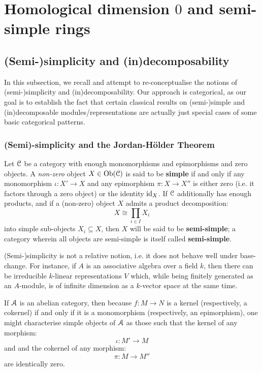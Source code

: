 \section{Homological dimension \texorpdfstring{$0$}{} and semi-simple rings}
    \subsection{(Semi-)simplicity and (in)decomposability}
        In this subsection, we recall and attempt to re-conceptualise the notions of (semi-)simplicity and (in)decomposability. Our approach is categorical, as our goal is to establish the fact that certain classical results on (semi-)simple and (in)decomposable modules/representations are actually just special cases of some basic categorical patterns. 
    
        \subsubsection{(Semi)-simplicity and the Jordan-H\"older Theorem}
            \begin{definition} \label{def: (semi)_simple_objects}
                Let $\mathcal{C}$ be a category with enough monomorphisms and epimorphisms and zero objects. A \textit{non-zero} object $X \in \mathrm{Ob}(\mathcal{C})$ is said to be \textbf{simple} if and only if any monomorphism $\iota: X' \to X$ and any epimorphism $\pi: X \to X''$ is either zero (i.e. it factors through a zero object) or the identity $\mathrm{id}_X$. If $\mathcal{C}$ additionally has enough products, and if a (non-zero) object $X$ admits a product decomposition:
                    $$X \cong \prod_{i \in I} X_i$$
                into simple sub-objects $X_i \subseteq X$, then $X$ will be said to be \textbf{semi-simple}; a category wherein all objects are semi-simple is itself called \textbf{semi-simple}.
            \end{definition}
            \begin{example}
                (Semi-)simplicity is not a relative notion, i.e. it does not behave well under base-change. For instance, if $A$ is an associative algebra over a field $k$, then there can be irreducible $k$-linear representations $V$ which, while being finitely generated as an $A$-module, is of infinite dimension as a $k$-vector space at the same time.
            \end{example}
            \begin{remark}
                If $\mathcal{A}$ is an abelian category, then because $f: M \to N$ is a kernel (respectively, a cokernel) if and only if it is a monomorphism (respectively, an epimorphism), one might characterise simple objects of $\mathcal{A}$ as those such that the kernel of any morphism:
                    $$\iota: M' \to M$$
                and and the cokernel of any morphism:
                    $$\pi: M \to M''$$
                are identically zero. 
            \end{remark}
